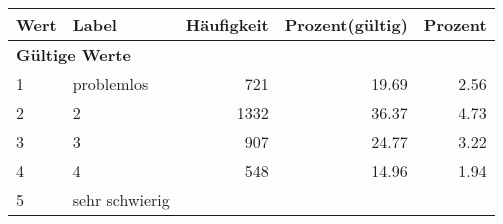      \begin{longtable}{lXrrr}
     \toprule
     \textbf{Wert} & \textbf{Label} & \textbf{Häufigkeit} & \textbf{Prozent(gültig)} & \textbf{Prozent} \\
     \endhead
     \midrule
     \multicolumn{5}{l}{\textbf{Gültige Werte}}\\

     1 &
     \multicolumn{1}{X}{ problemlos   } &


       \num{721} &
       \num[round-mode=places,round-precision=2]{19.69} &
         \num[round-mode=places,round-precision=2]{2.56} \\

     2 &
     \multicolumn{1}{X}{ 2   } &


       \num{1332} &
       \num[round-mode=places,round-precision=2]{36.37} &
         \num[round-mode=places,round-precision=2]{4.73} \\

     3 &
     \multicolumn{1}{X}{ 3   } &


       \num{907} &
       \num[round-mode=places,round-precision=2]{24.77} &
         \num[round-mode=places,round-precision=2]{3.22} \\

     4 &
     \multicolumn{1}{X}{ 4   } &


       \num{548} &
       \num[round-mode=places,round-precision=2]{14.96} &
         \num[round-mode=places,round-precision=2]{1.94} \\

     5 &
     \multicolumn{1}{X}{ sehr schwierig   } &



\end{longtable}
